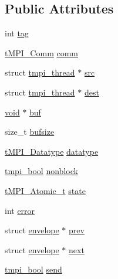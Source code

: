 \subsection*{\-Public \-Attributes}
\begin{DoxyCompactItemize}
\item 
int \hyperlink{structenvelope_a0588b9f6a7d4702209c5a0dc1b045183}{tag}
\item 
\hyperlink{include_2thread__mpi_2tmpi_8h_ab76dc275b882a1d00a54353fb8dd4cb3}{t\-M\-P\-I\-\_\-\-Comm} \hyperlink{structenvelope_aa27989fe2cdb728765dae8ebc7af00ce}{comm}
\item 
struct \hyperlink{structtmpi__thread}{tmpi\-\_\-thread} $\ast$ \hyperlink{structenvelope_a0190bde34d8a5e4d756c099167f01704}{src}
\item 
struct \hyperlink{structtmpi__thread}{tmpi\-\_\-thread} $\ast$ \hyperlink{structenvelope_abb8b38aed836438e8c64566aa02a92ab}{dest}
\item 
\hyperlink{nbnxn__kernel__simd__4xn__outer_8h_a8dc3f4a797ed992dff49d2fa3477eee8}{void} $\ast$ \hyperlink{structenvelope_a7f552788a13e834ca55aa72ca1ac5156}{buf}
\item 
size\-\_\-t \hyperlink{structenvelope_a50c7dfe457385585cb65d15b58cb1dd8}{bufsize}
\item 
\hyperlink{include_2thread__mpi_2tmpi_8h_a5dfe10378be22fca9362e52f6abdf503}{t\-M\-P\-I\-\_\-\-Datatype} \hyperlink{structenvelope_a7fb7546751cd5044702c430ceccbe3e2}{datatype}
\item 
\hyperlink{impl_8h_a1c904605658586a00645b5fc9f6b8479}{tmpi\-\_\-bool} \hyperlink{structenvelope_a38d738b5e91904001d203302c786e87a}{nonblock}
\item 
\hyperlink{include_2thread__mpi_2atomic_2gcc_8h_a2c33794dc540e3b07cffc1f81a3fe4b4}{t\-M\-P\-I\-\_\-\-Atomic\-\_\-t} \hyperlink{structenvelope_ab1928ed53037cef17c0f8352052400d4}{state}
\item 
int \hyperlink{structenvelope_a6e965012c0f9ab5e3c73cc6733f67b54}{error}
\item 
struct \hyperlink{structenvelope}{envelope} $\ast$ \hyperlink{structenvelope_a15bdcbc932f2b1153ec92ce5f3aed249}{prev}
\item 
struct \hyperlink{structenvelope}{envelope} $\ast$ \hyperlink{structenvelope_a66505214853c3f9a4a077f932082fb93}{next}
\item 
\hyperlink{impl_8h_a1c904605658586a00645b5fc9f6b8479}{tmpi\-\_\-bool} \hyperlink{structenvelope_ab42ac0d9da703327ec9aa200bbe9bbae}{send}
\item 

\end{DoxyCompactItemize}
